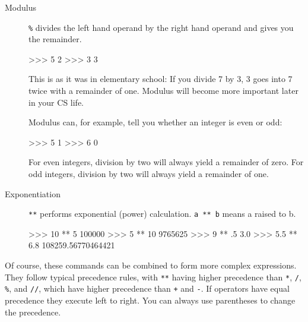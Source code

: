 \documentclass[11pt]{cselabheader}
\begin{document}
\begin{description}
  \item[Modulus] \texttt{\%} divides the left hand operand by the right hand
    operand and gives you the remainder.

    \begin{pyconcode}
>>> 5 %
2
>>> 3 %
3
    \end{pyconcode}

    This is as it was in elementary school: If you divide 7 by 3, 3 goes into 7
    twice with a remainder of one. Modulus will become more important later in
    your CS life.

    Modulus can, for example, tell you whether an integer is even or odd:

    \begin{pyconcode}
>>> 5 %
1
>>> 6 %
0
    \end{pyconcode}
    For even integers, division by two will always yield a remainder of zero.
    For odd integers, division by two will always yield a remainder of one.

  \item[Exponentiation] \texttt{**} performs exponential (power) calculation.
    \texttt{a ** b} means a raised to b.

    \begin{pyconcode}
>>> 10 ** 5
100000
>>> 5 ** 10 
9765625
>>> 9 ** .5
3.0
>>> 5.5 ** 6.8
108259.56770464421
    \end{pyconcode}

%
%
\end{description}

Of course, these commands can be combined to form more complex expressions. They
follow typical precedence rules, with \texttt{**} having higher precedence than
\texttt{*}, \texttt{/}, \texttt{\%}, and \texttt{//}, which have higher
precedence than \texttt{+} and \texttt{-}. If operators have equal precedence
they execute left to right. You can always use parentheses to change the
precedence.
\end{document}
